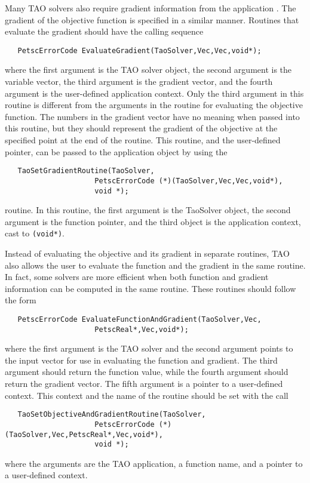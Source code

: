 Many TAO solvers also require gradient information from the 
application .
  The gradient of the objective function is specified in a similar manner.
Routines that evaluate the gradient should have the calling sequence
\begin{verbatim}
   PetscErrorCode EvaluateGradient(TaoSolver,Vec,Vec,void*);
\end{verbatim}
\noindent
where the first
argument is the TAO solver object, the second argument is the variable
vector, the third argument is the gradient vector, and the fourth argument is
the user-defined application context.  Only the third argument in this
routine is different from the arguments in the routine for evaluating
the objective function.  The numbers in the gradient vector have no
meaning when passed into this routine, but they should represent the gradient
of the objective at the specified point at the end of the routine.
This routine, and the user-defined pointer, can be passed to the application
object by using the  
\begin{verbatim}
   TaoSetGradientRoutine(TaoSolver,
                     PetscErrorCode (*)(TaoSolver,Vec,Vec,void*),
                     void *);
\end{verbatim}
routine. 
In this routine, the first argument is the TaoSolver object, the second argument
is the function pointer, and the third object is the application context, cast
to {\tt (void*)}.

Instead of evaluating the objective and its gradient in separate
routines, TAO also allows the user to evaluate the function and the gradient
in the same routine.  In fact, some solvers are more efficient when
both function and gradient information can be computed in the same routine.
These routines should follow the form
\begin{verbatim}
   PetscErrorCode EvaluateFunctionAndGradient(TaoSolver,Vec,
                     PetscReal*,Vec,void*);
\end{verbatim}
\noindent
where the first
argument is the TAO solver and the second
argument points to the input vector for use in evaluating the
function and gradient. The third argument should return the
function value, while the fourth argument should return the gradient vector.
The fifth argument is a pointer to a user-defined context.
This context and the name of the routine should be set with the
call 
\begin{verbatim}
   TaoSetObjectiveAndGradientRoutine(TaoSolver,
                     PetscErrorCode (*)(TaoSolver,Vec,PetscReal*,Vec,void*),
                     void *);
\end{verbatim}
where the arguments are the TAO application, a
function name, and a pointer to a user-defined context.


